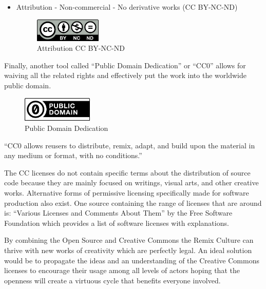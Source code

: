 \begin{itemize} 

  \item Attribution - Non-commercial - No derivative works (CC BY-NC-ND)

    \begin{figure}[H]
    \centering
    \includegraphics[width=0.3\textwidth]{images/by-nc-nd.png}
    \caption{Attribution CC BY-NC-ND}
    \label{fig:ccBYNCND}
    \end{figure}

\end{itemize}

Finally, another tool called “Public Domain Dedication” or “CC0” allows for waiving all the related rights and effectively put the work into the worldwide public domain.

    \begin{figure}[H]
    \centering
    \includegraphics[width=0.3\textwidth]{images/cc-zero.png}
    \caption{Public Domain Dedication}
    \label{fig:cc0}
    \end{figure}

“CC0 allows reusers to distribute, remix, adapt, and build upon the material in any medium or format, with no conditions.”

The CC licenses do not contain specific terms about the distribution of source code because they are mainly focused on writings, visual arts, and other creative works. Alternative forms of permissive licensing specifically made for software production also exist. One source containing the range of licenses that are around is: “Various Licenses and Comments About Them” by the Free Software Foundation which provides a list of software licenses with explanations.

By combining the Open Source and Creative Commons the Remix Culture can thrive with new works of creativity which are perfectly legal. An ideal solution would be to propagate the ideas and an understanding of the Creative Commons licenses to encourage their usage among all levels of actors hoping that the openness will create a virtuous cycle that benefits everyone involved.